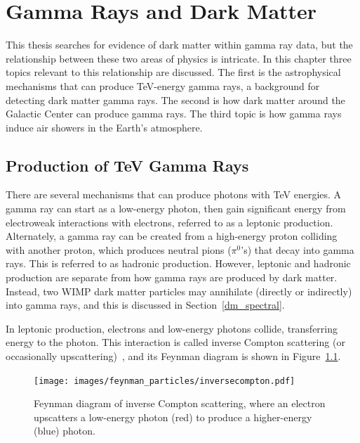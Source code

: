 \cleartooddpage[\thispagestyle{empty}]


\newcommand{\Lim}[1]{\raisebox{0.5ex}{\scalebox{0.8}{$\displaystyle \lim_{#1}\;$}}}
\renewcommand{\labelitemi}{\textbullet}
\newcommand{\pip}[1]{$\pi^{+}$}
\newcommand{\pim}[1]{$\pi^{-}$}
\newcommand{\pio}[1]{$\pi^{0}$}
\newcommand{\sv}{\left < \sigma v \right >}

\chapter{Gamma Rays and Dark Matter}\label{ch_gamma}


This thesis searches for evidence of dark matter within gamma ray data, but the relationship between these two areas of physics is intricate.
In this chapter three topics relevant to this relationship are discussed.
The first is the astrophysical mechanisms that can produce TeV-energy gamma rays, a background for detecting dark matter gamma rays.
The second is how dark matter around the Galactic Center can produce gamma rays.
The third topic is how gamma rays induce air showers in the Earth's atmosphere.

\section{Production of TeV Gamma Rays}

  There are several mechanisms that can produce photons with TeV energies.
  A gamma ray can start as a low-energy photon, then gain significant energy from electroweak interactions with electrons, referred to as a leptonic production.
  Alternately, a gamma ray can be created from a high-energy proton colliding with another proton, which produces neutral pions ($\pi^0$'s) that decay into gamma rays.
  This is referred to as hadronic production.
  However, leptonic and hadronic production are separate from how gamma rays are produced by dark matter.
  Instead, two WIMP dark matter particles may annihilate (directly or indirectly) into gamma rays, and this is discussed in Section~\ref{dm_spectral}.

  In leptonic production, electrons and low-energy photons collide, transferring energy to the photon.
  This interaction is called inverse Compton scattering (or occasionally upscattering)~\cite{compton_effect}, and its Feynman diagram is shown in Figure~\ref{fig:inv_compt_feyn}.
  
  \begin{figure}[!ht]
    \centering
    \texttt{[image: images/feynman\_particles/inversecompton.pdf]}
    \caption[Inverse Compton Scattering Feynman Diagram]{
      Feynman diagram of inverse Compton scattering, where an electron upscatters a low-energy photon (red) to produce a higher-energy (blue) photon.
    }
    \label{fig:inv_compt_feyn}
  \end{figure}
  \FloatBarrier
  
